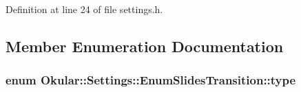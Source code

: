 Definition at line 24 of file settings.\+h.



\subsection{Member Enumeration Documentation}
\hypertarget{classOkular_1_1Settings_1_1EnumSlidesTransition_ae1bec274595e6aac4cdcfc809afb3d63}{
\subsubsection[{type}]{\setlength{\rightskip}{0pt plus 5cm}enum {\bf Okular\+::\+Settings\+::\+Enum\+Slides\+Transition\+::type}}}\label{classOkular_1_1Settings_1_1EnumSlidesTransition_ae1bec274595e6aac4cdcfc809afb3d63}
